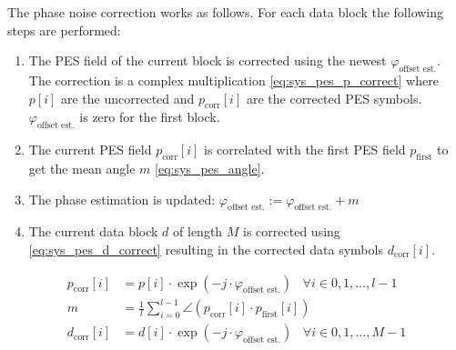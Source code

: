 The phase noise correction works as follows. For each data block
the following steps are performed:

\begin{enumerate}
\item The \gls{PES} field of the current block is corrected
  using the newest $\varphi_{\text{offset est.}}$.
  The correction is a complex multiplication \eqref{eq:sys_pes_p_correct}
  where $p[i]$ are the uncorrected and
  $p_{\text{corr}}[i]$ are the corrected \gls{PES} symbols.
  $\varphi_{\text{offset est.}}$ is zero for the first block.
\item The current \gls{PES} field $p_{\text{corr}}[i]$
  is correlated with the first \gls{PES} field $p_{\text{first}}$
  to get the mean angle $m$ \eqref{eq:sys_pes_angle}.
\item The phase estimation is updated:
  $\varphi_{\text{offset est.}} := \varphi_{\text{offset est.}} + m$
\item The current data block $d$ of length $M$ is corrected using
  \eqref{eq:sys_pes_d_correct} resulting in the corrected
  data symbols $d_{\text{corr}}[i]$.
\end{enumerate}

\begin{align}
  p_{\text{corr}}[i] &= p[i] \cdot \exp(-j \cdot \varphi_{\text{offset est.}})
  \;\;\; \forall i \in {0, 1, \dots, l-1}
  \label{eq:sys_pes_p_correct} \\
  m &= \frac{1}{l}
  \sum_{i=0}^{l-1} \angle(p_{\text{corr}}[i] \cdot p_{\text{first}}[i])
  \label{eq:sys_pes_angle} \\
  d_{\text{corr}}[i] &= d[i] \cdot \exp(-j \cdot \varphi_{\text{offset est.}})
  \;\;\; \forall i \in {0, 1, \dots, M-1}
  \label{eq:sys_pes_d_correct}
\end{align}

